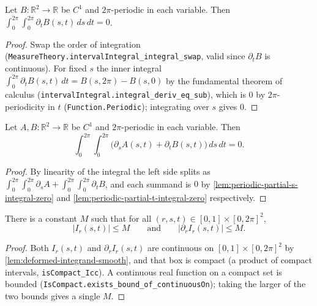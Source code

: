 \begin{lemma}
    \label{lem:periodic-partial-t-integral-zero}
    Let $B : \mathbb{R}^2\to\mathbb{R}$ be $C^1$ and $2\pi$-periodic in each
    variable. Then $\int_0^{2\pi}\!\int_0^{2\pi}\partial_t B(s,t)\,ds\,dt = 0$.
\end{lemma}
\begin{proof}
    Swap the order of integration
    (\texttt{MeasureTheory.intervalIntegral\_integral\_swap}, valid since
    $\partial_t B$ is continuous). For fixed $s$ the inner integral
    $\int_0^{2\pi}\partial_t B(s,t)\,dt = B(s,2\pi)-B(s,0)$ by the fundamental
    theorem of calculus (\texttt{intervalIntegral.integral\_deriv\_eq\_sub}), which
    is $0$ by $2\pi$-periodicity in $t$ (\texttt{Function.Periodic}); integrating
    over $s$ gives $0$.
\end{proof}

\begin{lemma}
    \label{lem:periodic-divergence-integral-zero}
    Let $A,B : \mathbb{R}^2\to\mathbb{R}$ be $C^1$ and $2\pi$-periodic in each
    variable. Then
    \[
        \int_0^{2\pi}\!\!\int_0^{2\pi}\bigl(\partial_s A(s,t) + \partial_t B(s,t)\bigr)\,ds\,dt = 0 .
    \]
\end{lemma}
\begin{proof}
    By linearity of the integral the left side splits as
    $\int_0^{2\pi}\!\int_0^{2\pi}\partial_s A + \int_0^{2\pi}\!\int_0^{2\pi}\partial_t B$,
    and each summand is $0$ by \cref{lem:periodic-partial-s-integral-zero} and
    \cref{lem:periodic-partial-t-integral-zero} respectively.
\end{proof}

\begin{lemma}
    \label{lem:integrand-uniform-bound}
    There is a constant $M$ such that for all $(r,s,t)\in[0,1]\times[0,2\pi]^2$,
    \[
        \lvert I_r(s,t)\rvert \le M \qquad\text{and}\qquad
        \lvert \partial_r I_r(s,t)\rvert \le M .
    \]
\end{lemma}
\begin{proof}
    Both $I_r(s,t)$ and $\partial_r I_r(s,t)$ are continuous on
    $[0,1]\times[0,2\pi]^2$ by \cref{lem:deformed-integrand-smooth}, and that box is
    compact (a product of compact intervals, \texttt{isCompact\_Icc}). A continuous
    real function on a compact set is bounded
    (\texttt{IsCompact.exists\_bound\_of\_continuousOn}); taking the larger of the two
    bounds gives a single $M$.
\end{proof}

